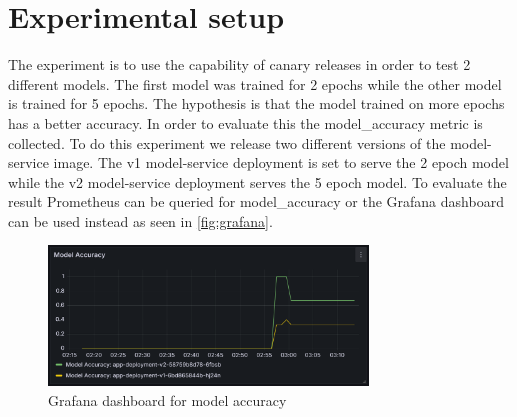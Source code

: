 \section{Experimental setup}
The experiment is to use the capability of canary releases in order to test 2 different models. The first model was trained for 2 epochs while the other model is trained for 5 epochs. The hypothesis is that the model trained on more epochs has a better accuracy. In order to evaluate this the model\_accuracy metric is collected. To do this experiment we release two different versions of the model-service image. The v1 model-service deployment is set to serve the 2 epoch model while the v2 model-service deployment serves the 5 epoch model. To evaluate the result Prometheus can be queried for model\_accuracy or the Grafana dashboard can be used instead as seen in \autoref{fig:grafana}.

\begin{figure}[ht!]
    \centering
    \includegraphics[width=8.5cm]{report/images/grafana.png}
    \caption{Grafana dashboard for model accuracy}
    \label{fig:grafana}
\end{figure}